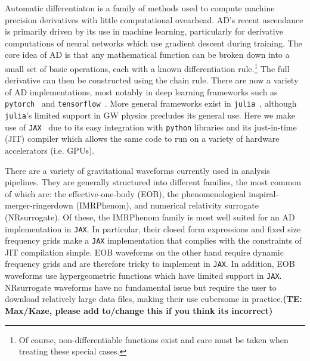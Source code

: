 \documentclass[twocolumn]{aastex631}
\newcommand{\jax}{\texttt{JAX}\xspace}
\newcommand{\te}[1]{\textbf{\color{pyGreen}(TE: #1)}}
\begin{document}
Automatic differentiaton is a family of methods used to compute machine precision derivatives with little computational ovearhead. 
AD's recent ascendance is primarily driven by its use in machine learning, particularly for derivative computations of neural networks which use gradient descent during training.
The core idea of AD is that any mathematical function can be broken down into a small set of basic operations, each with a known differentiation rule.\footnote{
    Of course, non-differentiable functions exist and care must be taken when treating these special cases.
    }
The full derivative can then be constructed using the chain rule.
There are now a variety of AD implementations, most notably in deep learning frameworks such as \texttt{pytorch}~\citep{pytorch} and \texttt{tensorflow}~\citep{tensorflow2015-whitepaper}.
More general frameworks exist in \texttt{julia}~\citep{zygote, forwarddiff}, although \texttt{julia}'s limited support in GW physics precludes its general use.
Here we make use of \jax~\citep{jax2018github} due to its easy integration with \texttt{python} libraries and its just-in-time (JIT) compiler which allows the same code to run on a variety of hardware accelerators (i.e. GPUs).

There are a variety of gravitational waveforms currently used in analysis pipelines.
They are generally structured into different families, the most common of which are: the effective-one-body (EOB), the phenomenological inspiral-merger-ringerdown (IMRPhenom), and numerical relativity surrogate (NRsurrogate).
Of these, the IMRPhenom family is most well suited for an AD implementation in \jax.
In particular, their closed form expressions and fixed size frequency grids make a \jax implementation that complies with the constraints of JIT compilation simple.
EOB waveforms on the other hand require dynamic frequency grids and are therefore tricky to implement in \jax. 
In addition, EOB waveforms use hypergeometric functions which have limited support in \jax.
NRsurrogate waveforms have no fundamental issue but require the user to download relatively large data files, making their use cubersome in practice.\te{Max/Kaze, please add to/change this if you think its incorrect}
\end{document}
